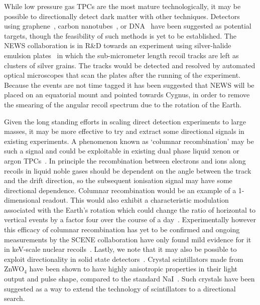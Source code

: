 While low pressure gas TPCs are the most mature technologically, it may be possible to directionally detect dark matter with other techniques. Detectors using graphene~\cite{Hochberg:2016ntt,Wang:2015kya}, carbon nanotubes~\cite{Capparelli:2014lua}, or DNA~\cite{Drukier:2012hj} have been suggested as potential targets, though the feasibility of such methods is yet to be established. The NEWS collaboration is in R\&D towards an experiment using silver-halide emulsion plates~\cite{Aleksandrov:2016fyr} in which the sub-micrometer length recoil tracks are left as clusters of silver grains. The tracks would be detected and resolved by automated optical microscopes that scan the plates after the running of the experiment. Because the events are not time tagged it has been suggested that NEWS will be placed on an equatorial mount and pointed towards Cygnus, in order to remove the smearing of the angular recoil spectrum due to the rotation of the Earth.

Given the long standing efforts in scaling direct detection experiments to large masses, it may be more effective to try and extract some directional signals in existing experiments. A phenomenon known as `columnar recombination' may be such a signal and could be exploitable in existing dual phase liquid xenon or argon TPCs~\cite{Nygren:2013nda,Mohlabeng:2015efa,Li:2015zga,Cadeddu:2017ebu}. In principle the recombination between electrons and ions along recoils in liquid noble gases should be dependent on the angle between the track and the drift direction, so the subsequent ionisation signal may have some directional dependence. Columnar recombination would be an example of a 1-dimensional readout. This would also exhibit a characteristic modulation associated with the Earth's rotation which could change the ratio of horizontal to vertical events by a factor four over the course of a day~\cite{Cadeddu:2016mac}. Experimentally however this efficacy of columnar recombination has yet to be confirmed and ongoing measurements by the SCENE collaboration have only found mild evidence for it in keV-scale nuclear recoils~\cite{Cao:2014gns}. Lastly, we note that it may also be possible to exploit directionality in solid state detectors~\cite{Bernabei:2003ct}. Crystal scintillators made from ZnWO$_4$ have been shown to have highly anisotropic properties in their light output and pulse shape, compared to the standard NaI~\cite{Cappella:2013rua}. Such crystals have been suggested as a way to extend the technology of scintillators to a directional search.

